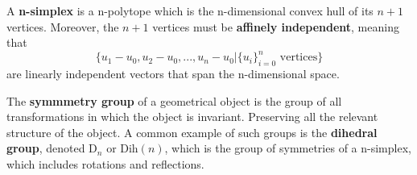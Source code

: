 \documentclass{article}
\begin{document}
      \begin{definition}
        A \textbf{n-simplex} is a n-polytope which is the n-dimensional convex hull of its $n+1$ vertices. Moreover, the $n+1$ vertices must be \textbf{affinely independent}, meaning that
        \begin{equation}
          \{u_1 - u_0, u_2 - u_0, ..., u_n - u_0 | \{u_i\}_{i=0}^{n} \text{ vertices} \}
        \end{equation}
        are linearly independent vectors that span the n-dimensional space. 
      \end{definition}

      \begin{definition}
        The \textbf{symmmetry group} of a geometrical object is the group of all transformations in which the object is invariant. Preserving all the relevant structure of the object. A common example of such groups is the \textbf{dihedral group}, denoted D$_{n}$ or Dih$(n)$, which is the group of symmetries of a n-simplex, which includes rotations and reflections. 
      \end{definition}
\end{document}
